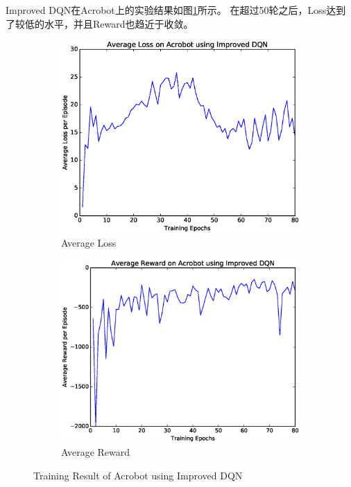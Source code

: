 \documentclass[a4paper,UTF8]{article}
\theoremstyle{definition}
\begin{document}
Improved DQN在Acrobot上的实验结果如图\ref{fig:bot-idqn}所示。
在超过50轮之后，Loss达到了较低的水平，并且Reward也趋近于收敛。

\begin{figure}[H]
	\centering
	\begin{subfigure}[t]{0.5\textwidth}
		\centering
		\includegraphics[scale=0.35]{figures/bot-idqn-loss}
		\caption{Average Loss}
	\end{subfigure}%
	\begin{subfigure}[t]{0.5\textwidth}
		\centering
		\includegraphics[scale=0.35]{figures/bot-idqn-reward}
		\caption{Average Reward}
	\end{subfigure}
	\caption{Training Result of Acrobot using Improved DQN}\label{fig:bot-idqn}
\end{figure}
\end{document}
